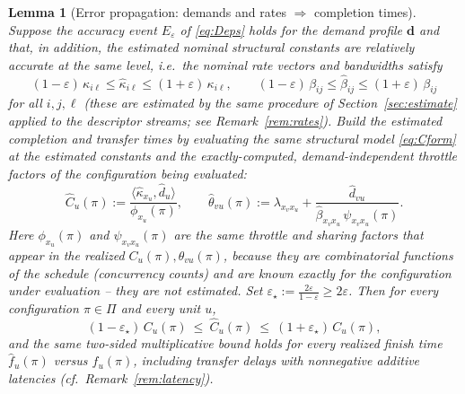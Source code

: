 \documentclass{amsart}
\newtheorem{lemma}{Lemma}
\theoremstyle{definition}
\newcommand{\Chat}{\widehat{C}}
\begin{document}
\begin{lemma}[Error propagation: demands and rates $\Rightarrow$ completion times]\label{lem:propagate}
Suppose the accuracy event $E_\varepsilon$ of \eqref{eq:Deps} holds for the
demand profile $\mathbf d$ and that, in addition, the estimated nominal
structural constants are relatively accurate at the same level, i.e.\ the
nominal rate vectors and bandwidths satisfy
\begin{equation}\label{eq:rateacc}
(1-\varepsilon)\,\kappa_{i\ell}\le\widehat\kappa_{i\ell}\le(1+\varepsilon)\,\kappa_{i\ell},
\qquad
(1-\varepsilon)\,\beta_{ij}\le\widehat\beta_{ij}\le(1+\varepsilon)\,\beta_{ij}
\end{equation}
for all $i,j,\ell$ (these are estimated by the same procedure of
Section~\ref{sec:estimate} applied to the descriptor streams; see
Remark~\ref{rem:rates}). Build the estimated completion and transfer times by
evaluating the \emph{same} structural model \eqref{eq:Cform} at the estimated
constants \emph{and the exactly-computed, demand-independent throttle factors of
the configuration being evaluated}:
\[
\Chat_u(\pi):=\frac{\langle\widehat\kappa_{x_u},\widehat d_u\rangle}{\phi_{x_u}(\pi)},
\qquad
\widehat\theta_{vu}(\pi):=\lambda_{x_vx_u}+\frac{\widehat d_{vu}}
{\widehat\beta_{x_vx_u}\,\psi_{x_vx_u}(\pi)} .
\]
Here $\phi_{x_u}(\pi)$ and $\psi_{x_vx_u}(\pi)$ are the \emph{same} throttle and
sharing factors that appear in the realized $C_u(\pi),\theta_{vu}(\pi)$, because
they are combinatorial functions of the schedule (concurrency counts) and are
known exactly for the configuration under evaluation -- they are \emph{not}
estimated. Set $\varepsilon_\star:=\tfrac{2\varepsilon}{1-\varepsilon}\ge2\varepsilon$.
Then for every configuration $\pi\in\Pi$ and every unit $u$,
\begin{equation}\label{eq:Ceps}
(1-\varepsilon_\star)\,C_u(\pi)\ \le\ \Chat_u(\pi)\ \le\ (1+\varepsilon_\star)\,C_u(\pi),
\end{equation}
and the same two-sided multiplicative bound holds for every realized finish time
$\widehat f_u(\pi)$ versus $f_u(\pi)$, including transfer delays with nonnegative
additive latencies (cf.\ Remark~\ref{rem:latency}).
\end{lemma}
\end{document}
